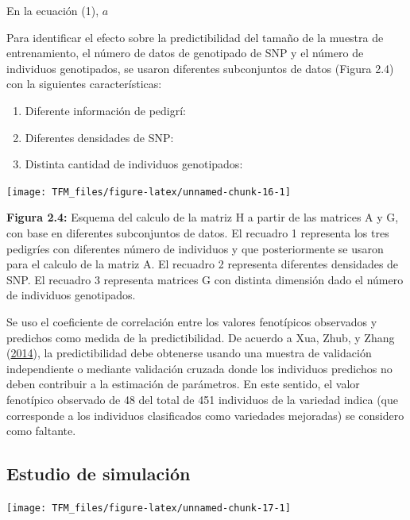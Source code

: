 \documentclass[11pt,spanish,a4paper,oneside,]{book} %
\begin{document}
En la ecuación (1), \(a\)

Para identificar el efecto sobre la predictibilidad del tamaño de la muestra de entrenamiento, el número de datos de genotipado de SNP y el número de individuos genotipados, se usaron diferentes subconjuntos de datos (Figura 2.4) con la siguientes características:

\begin{enumerate}
\def\labelenumi{\arabic{enumi}.}
\item
  Diferente información de pedigrí:
\item
  Diferentes densidades de SNP:
\item
  Distinta cantidad de individuos genotipados:
\end{enumerate}

\begin{center}\texttt{[image: TFM\_files/figure-latex/unnamed-chunk-16-1]} \end{center}

\begin{center}
\textbf{Figura 2.4:} Esquema del calculo de la matriz H a partir de las matrices A y G, con base en diferentes subconjuntos de datos. El recuadro 1 representa los tres pedigríes con diferentes número de individuos y que posteriormente se usaron para el calculo de la matriz A. El recuadro 2 representa diferentes densidades de SNP. El recuadro 3 representa matrices G con distinta dimensión dado el número de individuos genotipados.

\end{center}

Se uso el coeficiente de correlación entre los valores fenotípicos observados y predichos como medida de la predictibilidad. De acuerdo a Xua, Zhub, y Zhang (\protect\hyperlink{ref-cite:25}{2014}), la predictibilidad debe obtenerse usando una muestra de validación independiente o mediante validación cruzada donde los individuos predichos no deben contribuir a la estimación de parámetros. En este sentido, el valor fenotípico observado de 48 del total de 451 individuos de la variedad indica (que corresponde a los individuos clasificados como variedades mejoradas) se considero como faltante.

\hypertarget{estudio-de-simulaciuxf3n}{%
\subsection{Estudio de simulación}\label{estudio-de-simulaciuxf3n}}

\begin{center}\texttt{[image: TFM\_files/figure-latex/unnamed-chunk-17-1]} \end{center}
\end{document}
